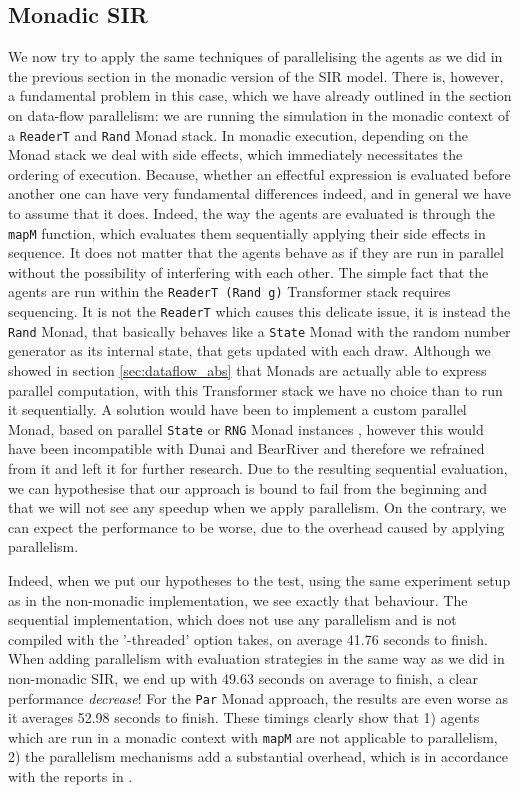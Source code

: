 \subsection{Monadic SIR}
We now try to apply the same techniques of parallelising the agents as we did in the previous section in the monadic version of the SIR model. There is, however, a fundamental problem in this case, which we have already outlined in the section on data-flow parallelism: we are running the simulation in the monadic context of a \texttt{ReaderT} and \texttt{Rand} Monad stack. In monadic execution, depending on the Monad stack we deal with side effects, which immediately necessitates the ordering of execution. Because, whether an effectful expression is evaluated before another one can have very fundamental differences indeed, and in general we have to assume that it does.
Indeed, the way the agents are evaluated is through the \texttt{mapM} function, which evaluates them sequentially applying their side effects in sequence. It does not matter that the agents behave as if they are run in parallel without the possibility of interfering with each other. The simple fact that the agents are run within the \texttt{ReaderT (Rand g)} Transformer stack requires sequencing. It is not the \texttt{ReaderT} which causes this delicate issue, it is instead the \texttt{Rand} Monad, that basically behaves like a \texttt{State} Monad with the random number generator as its internal state, that gets updated with each draw. Although we showed in section \ref{sec:dataflow_abs} that Monads are actually able to express parallel computation, with this Transformer stack we have no choice than to run it sequentially. A solution would have been to implement a custom parallel Monad, based on parallel \texttt{State} or \texttt{RNG} Monad instances \cite{par_extras_hackage}, however this would have been incompatible with Dunai and BearRiver and therefore we refrained from it and left it for further research.
Due to the resulting sequential evaluation, we can hypothesise that our approach is bound to fail from the beginning and that we will not see any speedup  when we apply parallelism. On the contrary, we can expect the performance to be worse, due to the overhead caused by applying parallelism.

Indeed, when we put our hypotheses to the test, using the same experiment setup as in the non-monadic implementation, we see exactly that behaviour. The sequential implementation, which does not use any parallelism and is not compiled with the '-threaded' option takes, on average 41.76 seconds to finish. When adding parallelism with evaluation strategies in the same way as we did in non-monadic SIR, we end up with 49.63 seconds on average to finish, a clear performance \textit{decrease}! For the \texttt{Par} Monad approach, the results are even worse as it averages 52.98 seconds to finish. These timings clearly show that 1) agents which are run in a monadic context with \texttt{mapM} are not applicable to parallelism, 2) the parallelism mechanisms add a substantial overhead, which is in accordance with the reports in \cite{marlow_parallel_2013}.

